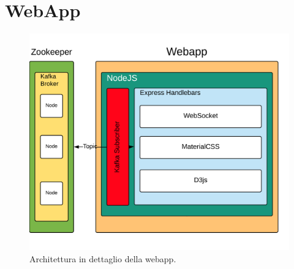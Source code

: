 \section{WebApp}
\label{sec:webapp}
\begin{figure}[H]
	\centering
	\includegraphics[width=\textwidth]{images/webApp.png}
	\caption{Architettura in dettaglio della webapp.}
	\label{fig:webAppArchitetture}
\end{figure}